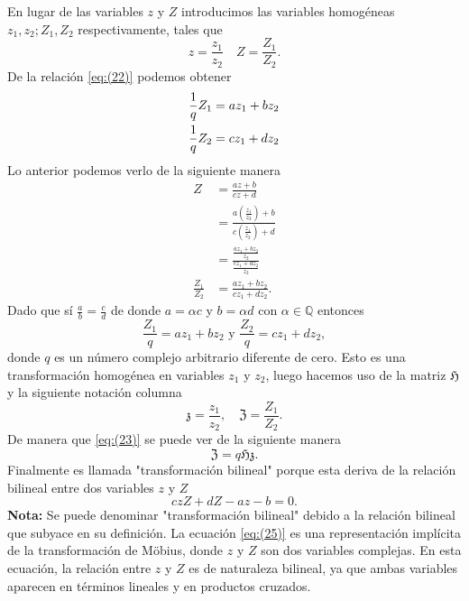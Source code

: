 \documentclass{matematicasud}
\begin{document}
En lugar de las variables $z$ y $Z$ introducimos las variables homogéneas $z_1,z_2;Z_1,Z_2$ respectivamente, tales que
\begin{equation*}
    z=\frac{z_1}{z_2} \quad Z=\frac{Z_1}{Z_2}.
\end{equation*}
De la relación \eqref{eq:(22)} podemos obtener
\begin{align}
    \frac{1}{q}Z_1&=az_1+bz_2\notag\\
    \frac{1}{q}Z_2&=cz_1+dz_2
    \label{eq:(23)}
\end{align}
Lo anterior podemos verlo de la siguiente manera
\begin{align*}
    Z&=\frac{az+b}{cz+d}\\
     &=\frac{a\left(\frac{z_1}{z_2}\right)+b}{c\left(\frac{z_1}{z_2}\right)+d}\\
     &=\frac{\frac{az_1+bz_2}{z_2}}{\frac{cz_1+dz_2}{z_2}}\\
     \frac{Z_1}{Z_2}&=\frac{az_1+bz_2}{cz_1+dz_2}.
\end{align*}
Dado que sí $\frac{a}{b}=\frac{c}{d}$ de donde $a=\alpha c$ y $b=\alpha d$ con $\alpha \in \mathbb{Q}$ entonces
\begin{equation*}
    \frac{Z_1}{q}=az_1+bz_2 \text{ y } \frac{Z_2}{q}=cz_1+dz_2,
\end{equation*}
donde $q$ es un número complejo arbitrario diferente de cero. Esto es una transformación homogénea en variables $z_1$ y $z_2$, luego hacemos uso de la matriz $\mathfrak{H}$ y la siguiente notación columna
\begin{equation*}
    \mathfrak{z}=\frac{z_1}{z_2}, \quad \mathfrak{Z}=\frac{Z_1}{Z_2}.
\end{equation*}
De manera que \eqref{eq:(23)} se puede ver de la siguiente manera
\begin{equation}
    \mathfrak{Z}=q\mathfrak{H}\mathfrak{z}.
    \label{eq:(24)}
\end{equation}
Finalmente es llamada "transformación bilineal" porque esta deriva de la relación bilineal entre dos variables $z$ y $Z$
\begin{equation}
    czZ+dZ-az-b=0.
    \label{eq:(25)}
\end{equation}
\textbf{Nota: }Se puede denominar "transformación bilineal" debido a la relación bilineal que subyace en su definición. La ecuación \eqref{eq:(25)} es una representación implícita de la transformación de Möbius, donde $z$ y $Z$ son dos variables complejas. En esta ecuación, la relación entre $z$ y $Z$ es de naturaleza bilineal, ya que ambas variables aparecen en términos lineales y en productos cruzados.
\end{document}
